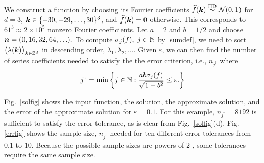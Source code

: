 \documentclass[graybox,footinfo]{svmult}
\begin{document}
We construct a function by choosing its Fourier coefficients $\widehat{f}({\boldsymbol{k}}) \overset{\text{IID}}{\sim}  \mathcal{N}(0,1)$ for $d=3$, ${\boldsymbol{k}} \in \{-30, -29, \ldots, 30\}^3$, and $\widehat{f}({\boldsymbol{k}}) = 0$ otherwise.  This corresponds to $61^3 \approx 2 \times 10^5$ nonzero Fourier coefficients.  Let $ a= 2$ and  $b=1/2$ and 
 choose ${\boldsymbol{n}} = (0, 16, 32, 64, \ldots ).$
 To  compute $\sigma_j(f), \ j \in {\mathbb{N}}$ by \eqref{sumdef},
 we need to sort $\bigl(\lambda({\boldsymbol{k}})\bigr)_{{\boldsymbol{k}} \in {\mathbb{Z}}^d}$ in descending order, $\lambda_1, \lambda_2, \ldots$. Given $\varepsilon$, we can then find the number of series coefficients needed to satisfy the the error criterion, i.e., $n_{j^\dagger}$ where
 \[j^{\dagger} = \min \left\{j \in {\mathbb{N}} : \frac{ab\sigma_j(f)}{\sqrt{1-b^2}}  \le \varepsilon. \right\}\]
 
Fig.\ \ref{solfig} shows the input function, the solution, the approximate solution, and the error of the approximate solution for $\varepsilon = 0.1$.  For this example, $ n_{j^\dagger} = 8192$ is sufficient to satisfy the error tolerance, as is clear from Fig.\ \ref{solfig}(d).  Fig. \ref{errfig} shows the sample size, $n_{j^\dagger}$ needed for ten different error tolerances from $0.1$ to $10$. Because the possible sample sizes are powers of $2$ , some tolerances require the same sample size.
\end{document}
